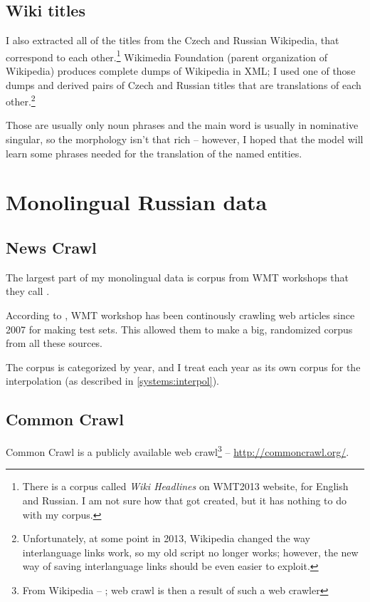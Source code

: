 \subsection{Wiki titles}
\label{corpora:wiki}
I also extracted all of the titles from the Czech and Russian Wikipedia, that correspond to each other.\footnote{There is a corpus called \emph{Wiki Headlines} on WMT2013 website, for English and Russian. I am not sure how that got created, but it has nothing to do with my corpus.} 
Wikimedia Foundation (parent organization of Wikipedia) produces complete dumps of Wikipedia in XML; I used one of those dumps and derived pairs of Czech and Russian titles that are translations of each other.\footnote{Unfortunately, at some point in 2013, Wikipedia changed the way interlanguage links work, so my old script no longer works; however, the new way of saving interlanguage links should be even easier to exploit.}

Those are usually only noun phrases and the main word is usually in nominative singular, so the morphology isn't that rich -- however, I hoped that the model will learn some phrases needed for the translation of the named entities.
\section{Monolingual Russian data}
\label{corpora:monolingual}
\subsection{News Crawl}
The largest part of my monolingual data is corpus from WMT workshops that they call .

According to \cite{wmt_findings_2009}, WMT workshop has been continously crawling web articles since 2007 for making test sets. This allowed them to make a big, randomized corpus from all these sources.

The corpus is categorized by year, and I treat each year as its own corpus for the interpolation (as described in \ref{systems:interpol}).%
\subsection{Common Crawl}
Common Crawl is a publicly available web crawl\footnote{From Wikipedia -- ; web crawl is then a result of such a web crawler} -- \url{http://commoncrawl.org/}.

